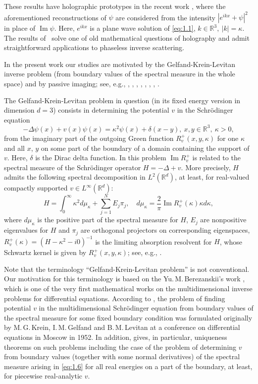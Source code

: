 \documentclass[JEP,XML,SOM,Unicode,NoEqCountersInSection,published]{cedram}
\newcommand{\RR}{\mathbb R}
\renewcommand{\Im}{\mathop{\mathrm{Im}}}
\theoremstyle{definition}
\begin{document}
These results have holographic prototypes in the recent work \cite{N5}, where the aforementioned reconstructions of $\psi$ are considered from the intensity $|e^{ikx}+\psi|^2$ in place of $\Im\psi$.
Here, $e^{ikx}$ is a plane wave solution of \eqref{eq:1.1}, \ie $k\in\RR^3,\ |k|=\kappa$. The results of~\cite{N5} solve one of old mathematical questions of holography and
admit straightforward applications to phaseless inverse scattering.

In the present work our studies are motivated by the Gelfand-Krein-Levitan inverse problem (from boundary values of the spectral measure in the whole space)
and by passive imaging; see, e.g., \cite{AHN1}, \cite{AHN2}, \cite{Ber}, \cite{BSS}, \cite{GP}, \cite{G}, \cite{MH}, \cite{WL}.

The Gelfand-Krein-Levitan problem in question (in its fixed energy version in dimension $d=3$) consists in determining the potential $v$ in the Schrödinger equation
\begin{equation}\label{eq:1.4}
-\Delta\psi(x) +v(x)\psi(x)= \kappa^2 \psi(x) +\delta(x-y),\ x,y\in \RR^3,\ \kappa>0,
\end{equation}
from the imaginary part of the outgoing Green function $R_v^+(x, y, \kappa)$ for one $\kappa$ and all $x$, $y$ on some part of the boundary of a domain containing the support of $v$.
Here, $\delta$ is the Dirac delta function.
In this problem $\Im R_v^+$ is related to the spectral measure of the Schrödinger operator $H=-\Delta+v$. More precisely, $H$
admits the following spectral decomposition in $L^2(\RR^d)$, at least, for real-valued compactly supported $v\in L^{\infty}(\RR^d)$:
\begin{equation}\label{eq:1.6}
H=\int_0^{\infty}\kappa^2 d\mu_{\kappa}+\sum_{j=1}^N E_j \pi_j, \quad d\mu_{\kappa}=\frac{2}{\pi}\Im R_v^+(\kappa)\kappa d\kappa,
\end{equation}
where $d\mu_{\kappa}$ is the positive part of the spectral measure for $H$, $E_j$ are nonpositive eigenvalues for $H$ and
$\pi_j$ are orthogonal projectors on corresponding eigenspaces, $R_v^+(\kappa)=(H-\kappa^2-i0)^{-1}$ is the limiting absorption resolvent for $H$,
whose Schwartz kernel is given by $R_v^+(x, y, \kappa)$; see, e.g., \cite[Lem.\,14.6.1]{H}.

Note that the terminology ``Gelfand-Krein-Levitan problem'' is not conventional.
Our motivation for this terminology is based on the Yu.\,M.\,Berezanskii's work \cite{Ber},
which is one of the very first mathematical works on the multidimensional inverse problems for differential equations.
According to \cite{Ber}, the problem of finding potential $v$ in the multidimensional Schrödinger equation
from boundary values of the spectral measure for some fixed boundary condition was formulated originally
by M.\,G.\,Krein, I.\,M.\,Gelfand and B.\,M.\,Levitan at a conference on differential equations in Moscow in 1952.
In addition, \cite{Ber} gives, in particular, uniqueness theorems on such problems including the case of the problem of determining $v$
from boundary values (together with some normal derivatives) of the spectral measure arising in \eqref{eq:1.6} for all real energies on a part of the boundary,
at least, for piecewise real-analytic $v$.
\end{document}
